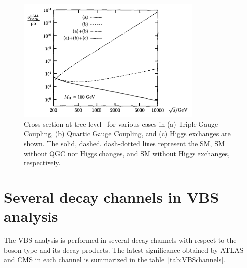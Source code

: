 \begin{figure}[tbp]
\begin{center}
 \includegraphics[width=0.80\textwidth,keepaspectratio]{figures/violation}
\caption{
Cross section at tree-level~\cite{DENNER199827} for various cases in (a) Triple Gauge Coupling, (b) Quartic Gauge Coupling, and (c) Higgs exchanges are shown. The solid, dashed. dash-dotted lines represent the SM, SM without QGC nor Higgs changes, and SM without Higgs exchanges, respectively.
}
\label{fig:violation}
\end{center}
\end{figure}

\section{Several decay channels in VBS analysis}
The VBS analysis is performed in several decay channels with respect to the boson type and its decay products.
The latest significance obtained by ATLAS and CMS in each channel is summarized in the table~\ref{tab:VBSchannels}.

